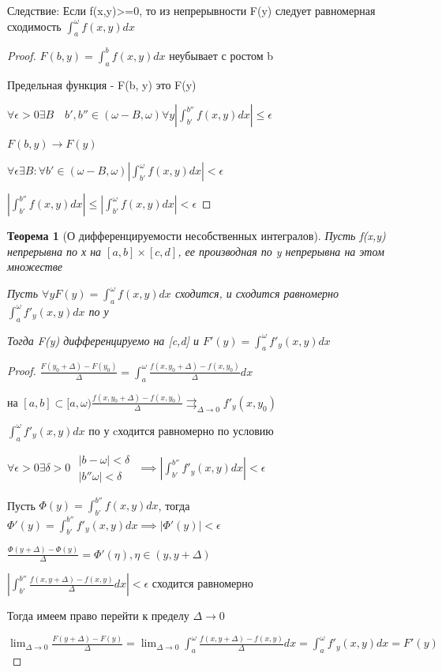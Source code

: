 \documentclass[a4paper]{article}
\newtheorem{theorem}{Теорема}[section]
\theoremstyle{definition}
\theoremstyle{remark}
\begin{document}
     Следствие: Если f(x,y)>=0, то из непрерывности F(y) следует равномерная сходимость $\int_a^\omega f(x,y)dx$

\begin{proof}
     $F(b,y) = \int_a^b f(x,y) dx$ неубывает с ростом b

     Предельная функция - F(b, y) это F(y)

     $\forall \epsilon > 0 \exists B \quad b', b'' \in (\omega -B, \omega) \forall y |\int_{b'}^{b''}f(x,y) dx|\leq \epsilon$

     $F(b,y)\rightarrow F(y)$

     $\forall \epsilon\exists B: \forall b' \in (\omega - B, \omega) |\int_{b'}^\omega f(x,y)dx |< \epsilon$

     $|\int_{b'}^{b''}f(x,y) dx|\leq|\int_{b'}^\omega f(x,y)dx |< \epsilon$
\end{proof}
\begin{theorem}[О дифференцируемости несобственных интегралов]
     Пусть f(x,y) непрерывна по х на $[a,b] \times [c,d]$, ее производная по y непрерывна на этом множестве

     Пусть $\forall y F(y) = \int_a^\omega f(x,y )dx$ сходится, и сходится равномерно $\int_a^\omega f'_y(x,y )dx$ по у

     Тогда F(y) дифференцируемо на [c,d] и $F'(y) = \int_a^\omega  f'_y(x,y)dx$
\end{theorem}

\begin{proof}
     $\frac{F(y_0+\Delta) - F(y_0)}{\Delta} = \int_a^\omega\frac{f(x, y_0 +\Delta) - f(x, y_0)}{\Delta}dx$

     на $[a,b] \subset [a,\omega) \frac{f(x, y_0 +\Delta) - f(x, y_0)}{\Delta}\rightrightarrows_{\Delta\to 0}f'_y(x,y_0)$

     $\int_a^\omega f'_y(x,y )dx$ по у cходится равномерно по условию

     $\forall \epsilon > 0\exists \delta > 0$
     $
     \begin{array}{l}
          |b - \omega|< \delta\\
          |b'' \omega|<\delta
     \end{array}
     $
     $\implies |\int_{b'}^{b''} f'_y(x,y)dx|< \epsilon$

     Пусть $\Phi(y) = \int_{b'}^{b''}f(x,y)dx$, тогда $\Phi'(y) = \int_{b'}^{b''}f'_y(x,y)dx\implies |\Phi'(y)|<\epsilon$

     $\frac{\Phi(y+\Delta) - \Phi(y)}{\Delta} = \Phi'(\eta ), \eta \in (y, y+ \Delta)$

     $|\int_{b'}^{b''} \frac{f(x, y +\Delta) - f(x, y)}{\Delta}dx|<\epsilon$ сходится равномерно

     Тогда имеем право перейти к пределу $\Delta \to 0$

     $\lim_{\Delta\to 0}\frac{F(y + \Delta) - F(y)}{\Delta} = \lim_{\Delta\to 0} \int_a^\omega \frac{f(x, y+\Delta) - f(x,y) }{\Delta}dx=\int_a^\omega f'_y(x,y)dx = F'(y)$


\end{proof}
\end{document}
